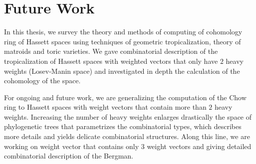 \chapter{Future Work}
In this thesis, we survey the theory and methods of computing of cohomology ring of Hassett spaces using techniques of geometric tropicalization, theory of matroids and toric varieties. We gave combinatorial description of the tropicalization of Hassett spaces with weighted vectors that only have $2$ heavy weights (Losev-Manin space) and investigated in depth the calculation of the cohomology of the space.  

For ongoing and future work, we are generalizing the computation of the Chow ring to Hassett spaces with weight vectors that contain more than $2$ heavy weights. 
Increasing the number of heavy weights enlarges drastically the space of phylogenetic trees that parametrizes the combinatorial types, which describes more details and yields delicate combinatorial structures. 
Along this line, we are working on weight vector that contains only $3$ weight vectors and giving detailed combinatorial description of the Bergman. 
